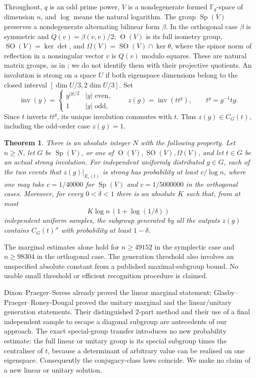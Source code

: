 \documentclass[11pt]{article}
\newtheorem{theorem}{Theorem}[section]
\newcommand{\F}{\mathbb F}
\newcommand{\Sp}{\operatorname{Sp}}
\newcommand{\Or}{\operatorname O}
\newcommand{\SO}{\operatorname{SO}}
\newcommand{\Om}{\Omega}
\newcommand{\inv}{\operatorname{inv}}
\newcommand{\eps}{\varepsilon}
\begin{document}
Throughout, $q$ is an odd prime power, $V$ is a nondegenerate formed $\F_q$-space of dimension $n$, and $\log$ means the natural logarithm. The group $\Sp(V)$ preserves a nondegenerate alternating bilinear form $\beta$. In the orthogonal case $\beta$ is symmetric and $Q(v)=\beta(v,v)/2$; $\Or(V)$ is its full isometry group, $\SO(V)=\ker\det$, and $\Om(V)=\SO(V)\cap\ker\theta$, where the spinor norm of reflection in a nonsingular vector $v$ is $Q(v)$ modulo squares. These are natural matrix groups, as in \cite[Sections~1.1--1.2]{lgo}; we do not identify them with their projective quotients. An involution is strong on a space $U$ if both eigenspace dimensions belong to the closed interval $[\dim U/3,2\dim U/3]$. Set
\[
\inv(y)=\begin{cases}y^{|y|/2}& |y|\text{ even},\\1&|y|\text{ odd},\end{cases}
\qquad z(g)=\inv(tt^g),\qquad t^g=g^{-1}tg.
\]
Since $t$ inverts $tt^g$, its unique involution commutes with $t$. Thus $z(g)\in C_G(t)$, including the odd-order case $z(g)=1$.

\begin{theorem}\label{main}
There is an absolute integer $N$ with the following property. Let $n\ge N$, let $G$ be $\Sp(V)$, or one of $\Or(V),\SO(V),\Om(V)$, and let $t\in G$ be an actual strong involution. For independent uniformly distributed $g\in G$, each of the two events that $z(g)|_{E_\eps(t)}$ is strong has probability at least $c/\log n$, where one may take $c=1/40000$ for $\Sp(V)$ and $c=1/5000000$ in the orthogonal cases. Moreover, for every $0<\delta<1$ there is an absolute $K$ such that, from at most
\[
K\log n\,(1+\log(1/\delta))
\]
independent uniform samples, the subgroup generated by all the outputs $z(g)$ contains $C_G(t)''$ with probability at least $1-\delta$.
\end{theorem}
The marginal estimates alone hold for $n\ge49152$ in the symplectic case and $n\ge98304$ in the orthogonal case. The generation threshold also involves an unspecified absolute constant from a published maximal-subgroup bound. No usable small threshold or efficient recognition procedure is claimed.

Dixon--Praeger--Seress \cite[Theorem~1.1]{dps} already proved the linear marginal statement; Glasby--Praeger--Roney-Dougal \cite[Theorems~1--2]{gprd} proved the unitary marginal and the linear/unitary generation statements. Their distinguished $2$-part method and their use of a final independent sample to escape a diagonal subgroup are antecedents of our approach. The exact special-group transfer introduces no new probability estimate: the full linear or unitary group is its special subgroup times the centraliser of $t$, because a determinant of arbitrary value can be realised on one eigenspace. Consequently the conjugacy-class laws coincide. We make no claim of a new linear or unitary solution.
\end{document}
